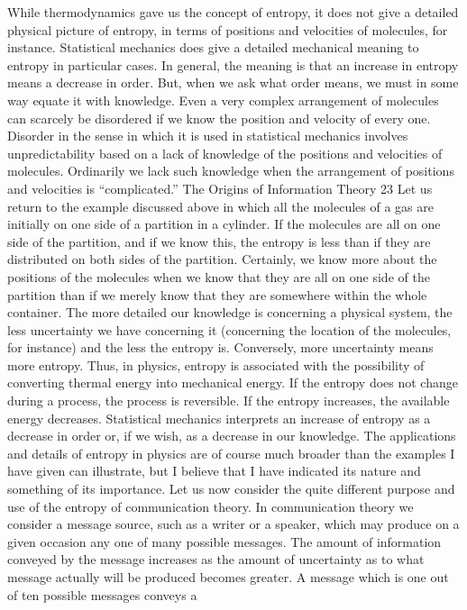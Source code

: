 While thermodynamics gave us the concept of entropy, it does
not give a detailed physical picture of entropy, in terms of positions
and velocities of molecules, for instance. Statistical mechanics does
give a detailed mechanical meaning to entropy in particular cases.
In general, the meaning is that an increase in entropy means a
decrease in order. But, when we ask what order means, we must
in some way equate it with knowledge. Even a very complex
arrangement of molecules can scarcely be disordered if we know
the position and velocity of every one. Disorder in the sense in
which it is used in statistical mechanics involves unpredictability
based on a lack of knowledge of the positions and velocities of
molecules. Ordinarily we lack such knowledge when the arrangement
of positions and velocities is “complicated.”
The Origins of Information Theory
23
Let us return to the example discussed above in which all the
molecules of a gas are initially on one side of a partition in a
cylinder. If the molecules are all on one side of the partition, and
if we know this, the entropy is less than if they are distributed on
both sides of the partition. Certainly, we know more about the
positions of the molecules when we know that they are all on one
side of the partition than if we merely know that they are somewhere
within the whole container. The more detailed our knowledge
is concerning a physical system, the less uncertainty we have
concerning it (concerning the location of the molecules, for
instance) and the less the entropy is. Conversely, more uncertainty
means more entropy.
Thus, in physics, entropy is associated with the possibility of
converting thermal energy into mechanical energy. If the entropy
does not change during a process, the process is reversible. If the
entropy increases, the available energy decreases. Statistical mechanics
interprets an increase of entropy as a decrease in order or,
if we wish, as a decrease in our knowledge.
The applications and details of entropy in physics are of course
much broader than the examples I have given can illustrate, but I
believe that I have indicated its nature and something of its importance.
Let us now consider the quite different purpose and use of
the entropy of communication theory.
In communication theory we consider a message source, such
as a writer or a speaker, which may produce on a given occasion
any one of many possible messages. The amount of information
conveyed by the message increases as the amount of uncertainty
as to what message actually will be produced becomes greater. A
message which is one out of ten possible messages conveys a
